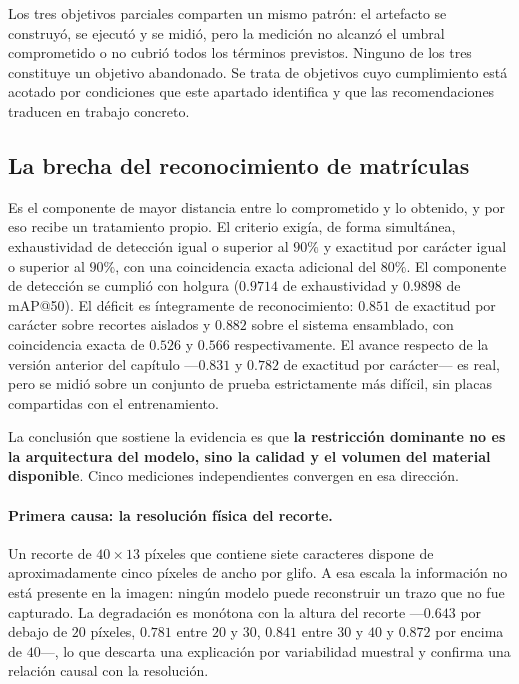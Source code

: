 Los tres objetivos parciales comparten un mismo patrón: el artefacto se
construyó, se ejecutó y se midió, pero la medición no alcanzó el umbral
comprometido o no cubrió todos los términos previstos. Ninguno de los tres
constituye un objetivo abandonado. Se trata de objetivos cuyo cumplimiento está
acotado por condiciones que este apartado identifica y que las recomendaciones
traducen en trabajo concreto.

\subsection{La brecha del reconocimiento de matrículas}
\label{subsec:brecha_ocr}

Es el componente de mayor distancia entre lo comprometido y lo obtenido, y por
eso recibe un tratamiento propio. El criterio exigía, de forma simultánea,
exhaustividad de detección igual o superior al $90\%$ y exactitud por carácter
igual o superior al $90\%$, con una coincidencia exacta adicional del $80\%$. El
componente de detección se cumplió con holgura ($0{.}9714$ de exhaustividad y
$0{.}9898$ de mAP@50). El déficit es íntegramente de reconocimiento: $0{.}851$ de
exactitud por carácter sobre recortes aislados y $0{.}882$ sobre el sistema
ensamblado, con coincidencia exacta de $0{.}526$ y $0{.}566$ respectivamente.
El avance respecto de la versión anterior del capítulo ---$0{.}831$ y $0{.}782$ de
exactitud por carácter--- es real, pero se midió sobre un conjunto de prueba
estrictamente más difícil, sin placas compartidas con el entrenamiento.

La conclusión que sostiene la evidencia es que \textbf{la restricción dominante
no es la arquitectura del modelo, sino la calidad y el volumen del material
disponible}. Cinco mediciones independientes convergen en esa dirección.

\paragraph{Primera causa: la resolución física del recorte.}
Un recorte de $40 \times 13$ píxeles que contiene siete caracteres dispone de
aproximadamente cinco píxeles de ancho por glifo. A esa escala la información no
está presente en la imagen: ningún modelo puede reconstruir un trazo que no fue
capturado. La degradación es monótona con la altura del recorte ---$0{.}643$ por
debajo de $20$ píxeles, $0{.}781$ entre $20$ y $30$, $0{.}841$ entre $30$ y $40$
y $0{.}872$ por encima de $40$---, lo que descarta una explicación por
variabilidad muestral y confirma una relación causal con la resolución.

